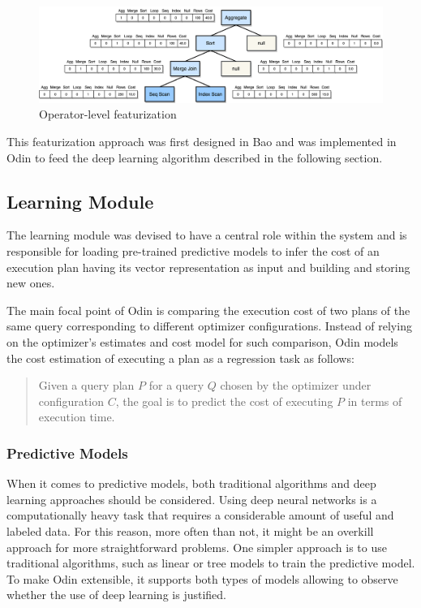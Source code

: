 \begin{figure}[H]
\centering
\includegraphics[width=\textwidth]{img/solution/operator_level_featurization.png}
\caption{Operator-level featurization}
\label{fig:operator_level_featurization}
\end{figure}

This featurization approach was first designed in Bao \citep{Marcus2020} and was implemented in Odin to feed the deep learning algorithm described in the following section.

\subsection{Learning Module}

The learning module was devised to have a central role within the system and is responsible for loading pre-trained predictive models to infer the cost of an execution plan having its vector representation as input and building and storing new ones.

The main focal point of Odin is comparing the execution cost of two plans of the same query corresponding to different optimizer configurations. Instead of relying on the optimizer's estimates and cost model for such comparison, Odin models the cost estimation of executing a plan as a regression task as follows:

\begin{quote}
Given a query plan $P$ for a query $Q$ chosen by the optimizer under configuration $C$, the goal is to predict the cost of executing $P$ in terms of execution time.    
\end{quote}

\subsubsection{Predictive Models}

When it comes to predictive models, both traditional algorithms and deep learning approaches should be considered. Using deep neural networks is a computationally heavy task that requires a considerable amount of useful and labeled data. For this reason, more often than not, it might be an overkill approach for more straightforward problems. One simpler approach is to use traditional algorithms, such as linear or tree models to train the predictive model. To make Odin extensible, it supports both types of models allowing to observe whether the use of deep learning is justified.

